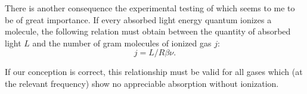 \documentclass[12pt]{article}
\begin{document}
There is another consequence the experimental testing of which seems to me to be
of great importance. If every absorbed light energy quantum ionizes a molecule,
the following relation must obtain between the quantity of absorbed light $L$
and the number of gram molecules of ionized gas $j$:
$$
j = L/R \beta \nu.
$$

If our conception is correct, this relationship must be valid for all gases
which (at the relevant frequency) show no appreciable absorption without
ionization.
\end{document}
